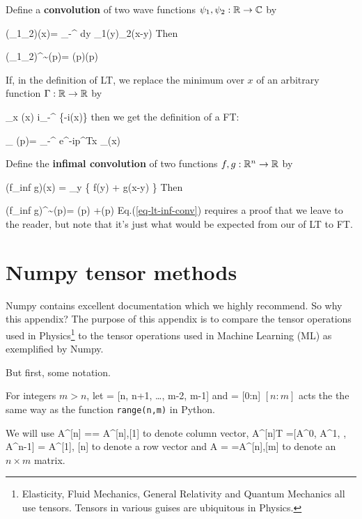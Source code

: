 Define a {\bf convolution}
of two 
wave functions $\psi_1, 
\psi_2:{ \mathbb{R}}\rightarrow { \mathbb{C}}$
by


\beq
(\psi_1\circledast\psi_2)(x)=
\int_{-\infty}^{\infty}
dy\;
\psi_1(y)\psi_2(x-y)
\eeq
Then

\beq
(\psi_1\circledast\psi_2)^\sim(p)=
(p)(p)
\eeq

If, in the definition
of LT,
we replace the minimum
over $x$ of
an arbitrary function $\Gamma:{ \mathbb{R}}\rightarrow { \mathbb{R}}$
by

\beq
\min_x \Gamma(x)\rarrow
i\ln\int_{-\infty}^{\infty}
\exp\{-i\Gamma(x)\}
\eeq
then we get the
definition
of a FT:

\beq
{}_
{\TIL{\psi}(p)}=
\int_{-\infty}^{\infty}
\;
e^{-ip^Tx} 
_{\psi(x)}
\eeq

Define the
{\bf infimal convolution}
of two functions
$f,g:{ \mathbb{R}}^n\rightarrow { \mathbb{R}}$ by

\beq
(f\circledast_{inf} g)(x)
=
\min_y \left\{
f(y) + g(x-y)
\right\}
\eeq
Then

\beq
(f\circledast_{inf} g)^\sim(p)=
(p) +(p)
\label{eq-lt-inf-conv}
\eeq
Eq.(\ref{eq-lt-inf-conv}) requires
a proof that we leave to the reader,
but note that it's just
what would be expected 
from our  of
LT to FT.

\section{Numpy tensor methods}
\label{sec-numpy-tensors}

Numpy contains 
excellent documentation
which we highly recommend.
So why this appendix? 
The purpose of this appendix is
to compare the tensor
operations
used in Physics\footnote{Elasticity, Fluid Mechanics, General Relativity and Quantum Mechanics all use tensors. Tensors in various guises are ubiquitous in Physics.}
to the tensor operations
used in Machine Learning (ML) as exemplified by Numpy.
 
 But first, some notation.
 
For integers $m> n$, let
\beq
[n:m] = [n, n+1, \ldots, m-2, m-1]
\eeq
and 
\beq
[n] = [0:n]
\eeq
$[n:m]$ acts the
the same way as 
the function {\tt range(n,m)} in Python.

We will use
\beq
A^{[n]} = = 
A^{[n],[1]}
\eeq 
to denote column vector,
\beq
A^{[n]T} =[A^0, A^1, \cdots, A^{n-1}] =
A^{[1], [n]}
\eeq
to denote a row vector
and
\beq
A = =A^{[n],[m]}
\eeq
to denote an $n\times m$ matrix.

